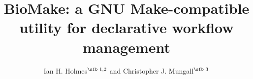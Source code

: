 \documentclass{bioinfo}
\begin{document}

\newcommand\structabs[5]{
\abstract{
{\bf Motivation.}
#1
{\bf Results.}
#2
{\bf Availability and Implementation.}
#3
{\bf Contact.}
#4
{\bf Supplementary Information.}
#5
}
\maketitle
}

\title[BioMake: declarative workflow management]{BioMake: a GNU Make-compatible utility for declarative workflow management}
\author[Ian H. Holmes and Christopher J. Mungall]{Ian H. Holmes$^{\text{\sfb 1,2}}$ and Christopher J. Mungall$^{\text{\sfb 3}}$}
\address{$^{\text{\sf 1}}$Department of Bioengineering, University of California, Berkeley, CA 94720, USA \\
 $^{\text{\sf 2}}$Molecular Biophysics and Integrated Bioimaging Division, Lawrence Berkeley National Laboratory, 1 Cyclotron Rd, Berkeley, CA 94720, USA. \\
$^{\text{\sf 3}}$Environmental Genomics and Systems Biology Division, Lawrence Berkeley National Laboratory, 1 Cyclotron Rd, Berkeley, CA 94720, USA.}

\corresp{}

\history{}

\editor{}


\end{document}
